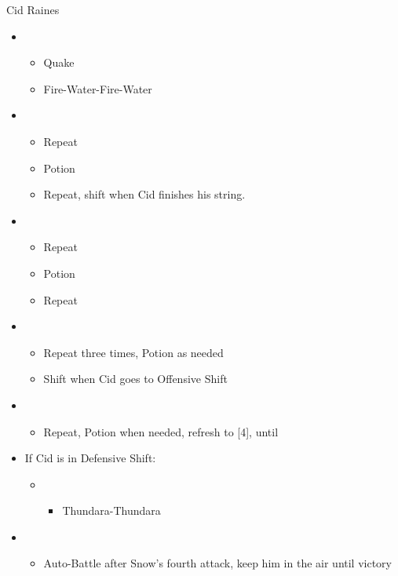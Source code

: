 	\begin{battle}[1:40]{Cid Raines}
		\begin{itemize}
			\item \first
			      \begin{itemize}
				      \item Quake
				      \item Fire-Water-Fire-Water
			      \end{itemize}
			\item \third
			      \begin{itemize}
				      \item Repeat
				      \item Potion
				      \item Repeat, shift when Cid finishes his string.
			      \end{itemize}
			\item \fifth
			      \begin{itemize}
				      \item Repeat
				      \item Potion
				      \item Repeat
			      \end{itemize}
			\item \second
			      \begin{itemize}
				      \item Repeat three times, Potion as needed
				      \item Shift when Cid goes to Offensive Shift
			      \end{itemize}
			\item \third
			      \begin{itemize}
				      \item Repeat, Potion when needed, refresh to [4], until \stagger
			      \end{itemize}
			\item If Cid is in Defensive Shift:
			      \begin{itemize}
				      \item \second
				            \begin{itemize}
					            \item Thundara-Thundara
				            \end{itemize}
			      \end{itemize}
			\item \sixth
			      \begin{itemize}
				      \item Auto-Battle after Snow's fourth attack, keep him in the air until victory
			      \end{itemize}
			     \end{itemize}
	\end{battle}
